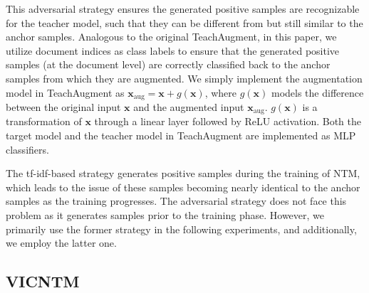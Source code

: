 \documentclass{article}
\begin{document}
This adversarial strategy ensures the generated positive samples are recognizable for the teacher model, such that they can be different from but still similar to the anchor samples. 
Analogous to the original TeachAugment, in this paper, we utilize document indices as class labels to ensure that the generated positive samples (at the document level) are correctly classified back to the anchor samples from which they are augmented. 
We simply implement the augmentation model in TeachAugment as $\mathbf{x}_{\text{aug}}=\mathbf{x}+g(\mathbf{x})$, where $g(\mathbf{x})$ models the difference between the original input $\mathbf{x}$ and the augmented input $\mathbf{x}_{\text{aug}}$. $g(\mathbf{x})$ is a transformation of $\mathbf{x}$ through a linear layer followed by ReLU activation. Both the target model and the teacher model in TeachAugment are implemented as MLP classifiers.

The tf-idf-based strategy generates positive samples during the training of NTM, which leads to the issue of these samples becoming nearly identical to the anchor samples as the training progresses. 
The adversarial strategy does not face this problem as it generates samples prior to the training phase. 
However, we primarily use the former strategy in the following experiments, and additionally, we employ the latter one.

\subsection{VICNTM}\label{vicntm}
\end{document}
